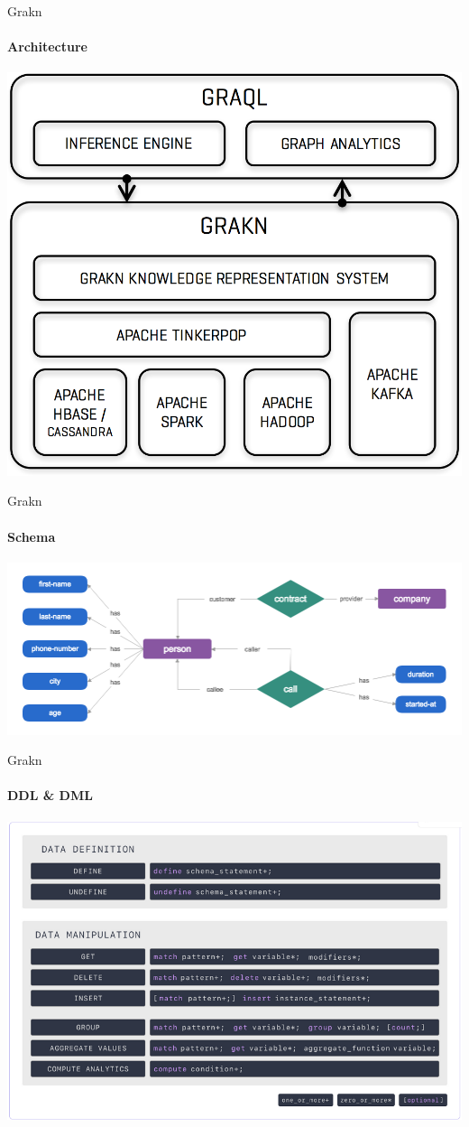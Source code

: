 \documentclass[aspectratio=169]{beamer}
\begin{document}
\begin{darkframes}
    \begin{frame}{Grakn}
      \framesubtitle{\alert{Architecture}}%
      \begin{center}
        \includegraphics[width=0.5\linewidth]{architecture}
      \end{center}
    \end{frame}    

    \begin{frame}{Grakn}
      \framesubtitle{\alert{Schema}}%
      \begin{center}
        \includegraphics[width=\linewidth]{schema}
      \end{center}
    \end{frame}      
    
    \begin{frame}{Grakn}
      \framesubtitle{\alert{DDL \& DML}}%
      \begin{center}
        \includegraphics[width=0.6\linewidth]{dmlyddl}
      \end{center}
    \end{frame}        


\end{darkframes}
\end{document}
